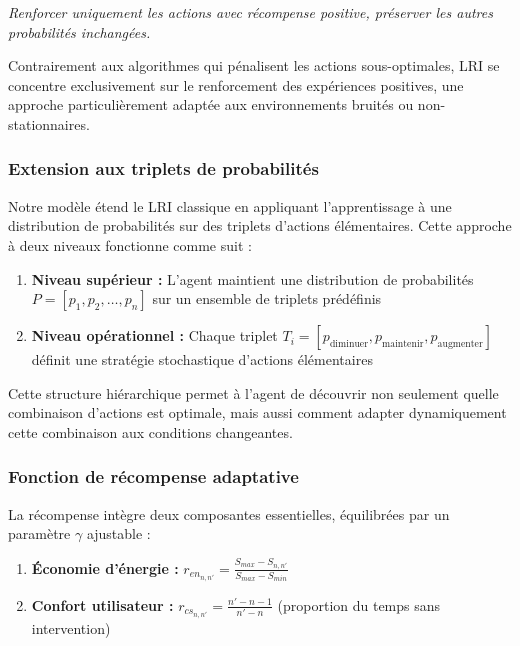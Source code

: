 \documentclass[a4paper,11pt]{article}
\begin{document}
\begin{mdframed}
\textit{Renforcer uniquement les actions avec récompense positive, préserver les autres probabilités inchangées.}
\end{mdframed}

Contrairement aux algorithmes qui pénalisent les actions sous-optimales, LRI se concentre exclusivement sur le renforcement des expériences positives, une approche particulièrement adaptée aux environnements bruités ou non-stationnaires.

\subsubsection{Extension aux triplets de probabilités}

Notre modèle étend le LRI classique en appliquant l'apprentissage à une distribution de probabilités sur des triplets d'actions élémentaires. Cette approche à deux niveaux fonctionne comme suit :

\begin{enumerate}
    \item \textbf{Niveau supérieur :} L'agent maintient une distribution de probabilités $P = [p_1, p_2, \ldots, p_n]$ sur un ensemble de triplets prédéfinis
    
    \item \textbf{Niveau opérationnel :} Chaque triplet $T_i = [p_{\text{diminuer}}, p_{\text{maintenir}}, p_{\text{augmenter}}]$ définit une stratégie stochastique d'actions élémentaires
\end{enumerate}

Cette structure hiérarchique permet à l'agent de découvrir non seulement quelle combinaison d'actions est optimale, mais aussi comment adapter dynamiquement cette combinaison aux conditions changeantes.

\subsubsection{Fonction de récompense adaptative}

La récompense intègre deux composantes essentielles, équilibrées par un paramètre $\gamma$ ajustable :

\begin{enumerate}
    \item \textbf{Économie d'énergie :} $r_{en_{n,n'}} = \frac{S_{max} - S_{n,n'}}{S_{max}  - S_{min}}$
    \item \textbf{Confort utilisateur :} $r_{cs_{n,n'}} = \frac{n' - n - 1}{n'-n}$ (proportion du temps sans intervention)
\end{enumerate}
\end{document}
